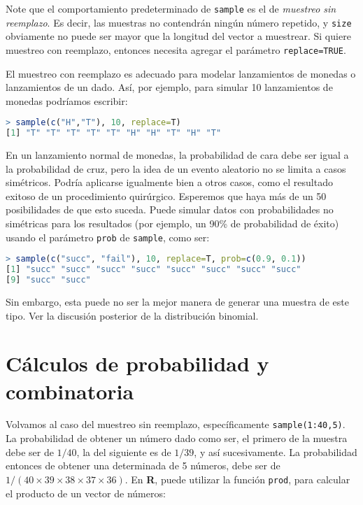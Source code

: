 Note que el comportamiento predeterminado de \texttt{sample} es el de
\textit{muestreo sin reemplazo}. Es decir, las muestras no contendrán ningún
número repetido, y \texttt{size} obviamente no puede ser mayor que la longitud
del vector a muestrear. Si quiere muestreo con reemplazo, entonces necesita
agregar el parámetro \texttt{replace=TRUE}.

El muestreo con reemplazo es adecuado para modelar lanzamientos de monedas o
lanzamientos de un dado. Así, por ejemplo, para simular 10 lanzamientos de
monedas podríamos escribir:

\begin{lstlisting}[language=R]
> sample(c("H","T"), 10, replace=T)
[1] "T" "T" "T" "T" "T" "H" "H" "T" "H" "T"
\end{lstlisting}

En un lanzamiento normal de monedas, la probabilidad de cara debe ser igual a la
probabilidad de cruz, pero la idea de un evento aleatorio no se limita a casos
simétricos.  Podría aplicarse igualmente bien a otros casos, como el resultado
exitoso de un procedimiento quirúrgico. Esperemos que haya más de un 50%
posibilidades de que esto suceda. Puede simular datos con probabilidades no
simétricas para los resultados (por ejemplo, un 90\% de probabilidad de éxito)
usando el parámetro \texttt{prob} de \texttt{sample}, como ser:

\begin{lstlisting}[language=R]
> sample(c("succ", "fail"), 10, replace=T, prob=c(0.9, 0.1))
[1] "succ" "succ" "succ" "succ" "succ" "succ" "succ" "succ"
[9] "succ" "succ"
\end{lstlisting}

Sin embargo, esta puede no ser la mejor manera de generar una muestra de este
tipo. Ver la discusión posterior de la distribución binomial.

\section{Cálculos de probabilidad y combinatoria}

Volvamos al caso del muestreo sin reemplazo, específicamente
\texttt{sample(1:40,5)}. La probabilidad de obtener un número dado como ser, el
primero de la muestra debe ser de $1/40$, la del siguiente es de $1/39$, y así
sucesivamente. La probabilidad entonces  de obtener una determinada de 5
números,  debe ser de $1/(40 \times 39 \times 38 \times 37 \times 36)$.  En
\textbf{R}, puede utilizar la función \texttt{prod}, para calcular el producto
de un vector de números:

